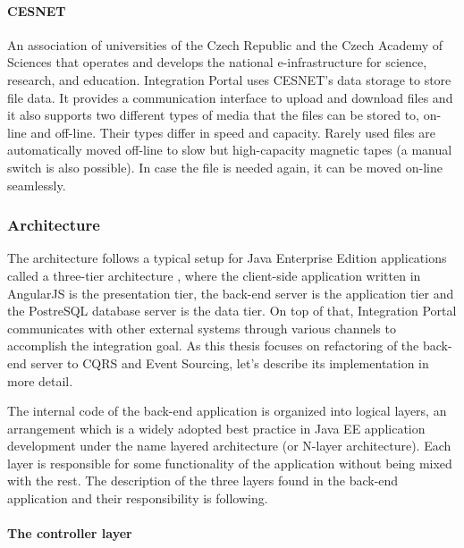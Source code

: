 \documentclass{book}
\begin{document}
\paragraph{CESNET}\label{cesnet}

An association of universities of the Czech Republic and the Czech
Academy of Sciences that operates and develops the national
e-infrastructure for science, research, and education. Integration
Portal uses CESNET's data storage to store file data. It provides a
communication interface to upload and download files and it also
supports two different types of media that the files can be stored to,
on-line and off-line. Their types differ in speed and capacity. Rarely
used files are automatically moved off-line to slow but high-capacity
magnetic tapes (a manual switch is also possible). In case the file is
needed again, it can be moved on-line seamlessly.

\subsubsection{Architecture}\label{architecture}

The architecture follows a typical setup for Java Enterprise Edition
applications called a three-tier architecture \cite{p-eap}, where the
client-side application written in AngularJS is the presentation tier,
the back-end server is the application tier and the PostreSQL database
server is the data tier. On top of that, Integration Portal communicates
with other external systems through various channels to accomplish the
integration goal. As this thesis focuses on refactoring of the back-end
server to CQRS and Event Sourcing, let's describe its implementation in
more detail.

The internal code of the back-end application is organized into logical
layers, an arrangement which is a widely adopted best practice in Java
EE application development under the name layered architecture (or
N-layer architecture). Each layer is responsible for some functionality
of the application without being mixed with the rest. The description of
the three layers found in the back-end application and their
responsibility is following.

\paragraph{The controller layer}\label{the-controller-layer}
\end{document}
